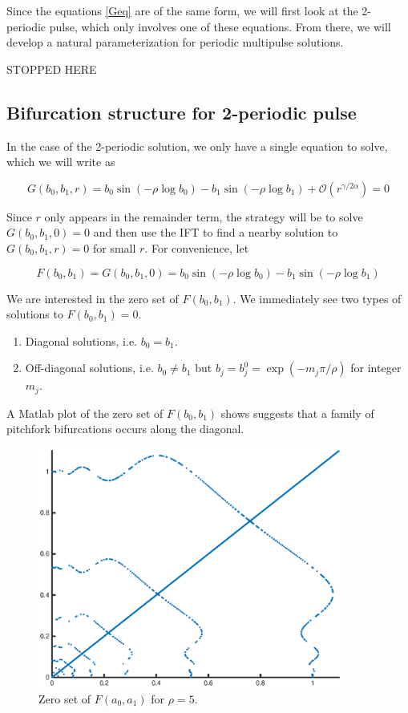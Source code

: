 \documentclass[thesis.tex]{subfiles}
\begin{document}
Since the equations \eqref{Geq} are of the same form, we will first look at the 2-periodic pulse, which only involves one of these equations. From there, we will develop a natural parameterization for periodic multipulse solutions.

STOPPED HERE

\subsection{Bifurcation structure for 2-periodic pulse}

In the case of the 2-periodic solution, we only have a single equation to solve, which we will write as

\begin{equation}\label{Geq1}
G(b_0, b_1, r) = b_0 \sin \left( -\rho \log b_0 \right) - b_1 \sin \left( -\rho \log b_1 \right) + \mathcal{O}(r^{\gamma / 2 \alpha}) = 0
\end{equation}

Since $r$ only appears in the remainder term, the strategy will be to solve $G(b_0, b_1, 0) = 0$ and then use the IFT to find a nearby solution to $G(b_0, b_1, r) = 0$ for small $r$. For convenience, let

\begin{equation}\label{defF}
F(b_0, b_1) = G(b_0, b_1, 0) = 
b_0 \sin \left( -\rho \log b_0 \right) - b_1 \sin \left( -\rho \log b_1 \right)
\end{equation}

We are interested in the zero set of $F(b_0, b_1)$. We immediately see two types of solutions to $F(b_0,b_1) = 0$. 

\begin{enumerate}
	\item Diagonal solutions, i.e. $b_0 = b_1$.
	\item Off-diagonal solutions, i.e. $b_0 \neq b_1$ but $b_j = b_j^0 = \exp(-m_j \pi / \rho )$ for integer $m_j$.
\end{enumerate}

A Matlab plot of the zero set of $F(b_0, b_1)$ shows suggests that a family of pitchfork bifurcations occurs along the diagonal. 

\begin{figure}[H]
\label{fig:Fzeronumeric}
\includegraphics[width=10cm]{periodic/zeroset5}
\caption{Zero set of $F(a_0, a_1)$ for $\rho = 5$.}
\end{figure} 
\end{document}
